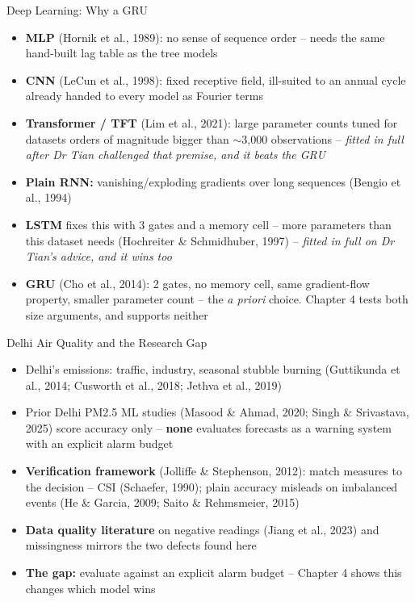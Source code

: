 \documentclass[12pt,aspectratio=169]{beamer}
\begin{document}
\begin{frame}{Deep Learning: Why a GRU}
  \footnotesize
  \begin{itemize}
    \item \textbf{MLP} (Hornik et al., 1989): no sense of sequence order
      -- needs the same hand-built lag table as the tree models
    \item \textbf{CNN} (LeCun et al., 1998): fixed receptive field,
      ill-suited to an annual cycle already handed to every model as
      Fourier terms
    \item \textbf{Transformer / TFT} (Lim et al., 2021): large parameter
      counts tuned for datasets orders of magnitude bigger than
      $\sim$3{,}000 observations -- \emph{fitted in full after Dr Tian
      challenged that premise, and it beats the GRU}
    \item \textbf{Plain RNN:} vanishing/exploding gradients over long
      sequences (Bengio et al., 1994)
    \item \textbf{LSTM} fixes this with 3 gates and a memory cell --
      more parameters than this dataset needs (Hochreiter \& Schmidhuber,
      1997) -- \emph{fitted in full on Dr Tian's advice, and it wins too}
    \item \textbf{GRU} (Cho et al., 2014): 2 gates, no memory cell, same
      gradient-flow property, smaller parameter count -- the \emph{a
      priori} choice. Chapter 4 tests both size arguments, and supports
      neither
  \end{itemize}
\end{frame}

\begin{frame}{Delhi Air Quality and the Research Gap}
  \begin{itemize}
    \item Delhi's emissions: traffic, industry, seasonal stubble burning
      (Guttikunda et al., 2014; Cusworth et al., 2018; Jethva et al.,
      2019)
    \item Prior Delhi PM2.5 ML studies (Masood \& Ahmad, 2020; Singh \&
      Srivastava, 2025) score accuracy only -- \textbf{none} evaluates forecasts
      as a warning system with an explicit alarm budget
    \item \textbf{Verification framework} (Jolliffe \& Stephenson, 2012):
      match measures to the decision -- CSI (Schaefer, 1990); plain
      accuracy misleads on imbalanced events (He \& Garcia, 2009; Saito
      \& Rehmsmeier, 2015)
    \item \textbf{Data quality literature} on negative readings (Jiang et
      al., 2023) and missingness mirrors the two defects found here
    \item \textbf{The gap:} evaluate against an explicit alarm budget --
      Chapter 4 shows this changes which model wins
  \end{itemize}
\end{frame}
\end{document}
